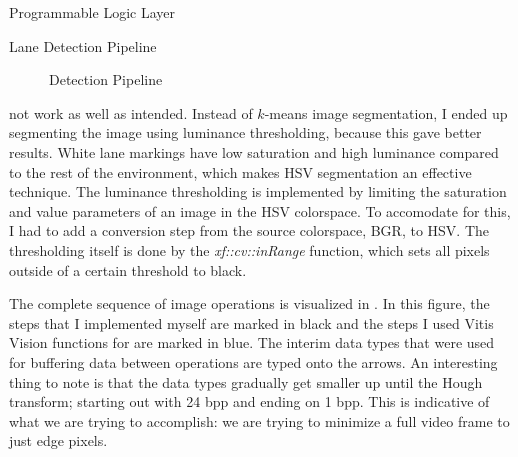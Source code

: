 \documentclass{matthijs}
\begin{document}
\begin{hoofdstuk}{Programmable Logic Layer}
\begin{paragraaf}{Lane Detection Pipeline}
\begin{figure}
				\vspace{-4ex}
				\caption{Detection Pipeline}
				\label{figuur:Detection Pipeline}
			\end{figure}
			not work as well as intended.
			Instead of $ k $-means image segmentation, I ended up segmenting the image using luminance thresholding, because this gave better results.
			White lane markings have low saturation and high luminance compared to the rest of the environment, which makes HSV segmentation an effective technique.
			The luminance thresholding is implemented by limiting the saturation and value parameters of an image in the HSV colorspace.
			To accomodate for this, I had to add a conversion step from the source colorspace, BGR, to HSV.
			The thresholding itself is done by the \textit{xf::cv::inRange} function, which sets all pixels outside of a certain threshold to black.

			\bigskip

			The complete sequence of image operations is visualized in .
			In this figure, the steps that I implemented myself are marked in black and the steps I used Vitis Vision functions for are marked in blue.
			The interim data types that were used for buffering data between operations are typed onto the arrows.
			An interesting thing to note is that the data types gradually get smaller up until the Hough transform; starting out with 24 bpp and ending on 1 bpp.
			This is indicative of what we are trying to accomplish: we are trying to minimize a full video frame to just edge pixels.
			

\end{paragraaf}
\end{hoofdstuk}
\end{document}

